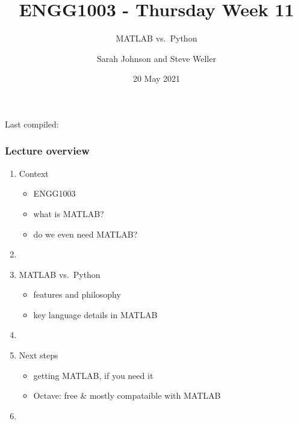 \documentclass[english,14pt]{beamer}
\title{ENGG1003 - Thursday Week 11}
\subtitle{MATLAB vs.~Python}
\author{Sarah Johnson and Steve Weller}
\institute{University of Newcastle}
\date{20 May 2021}
\begin{document}
\begin{flushleft}
{\scriptsize Last compiled:~\DTMnow}
\vspace*{-5mm}
\end{flushleft}
\framebreak


\begin{frame}[fragile]

\frametitle{Lecture overview}
\begin{enumerate}
	\item Context
	\begin{itemize}
		\item ENGG1003
		\item what is MATLAB?
		\item do we even need MATLAB?
	\end{itemize}

	\item[]
	
	\item MATLAB vs.~Python
	\begin{itemize}
		\item features and philosophy
		\item key language details in MATLAB
	\end{itemize}
	

	\item[]

	\item Next steps
	\begin{itemize}
		\item getting MATLAB, if you need it
		\item Octave: free \& mostly compataible with MATLAB
	\end{itemize}

	\item[]

\end{enumerate}

\end{frame}

\end{document}
